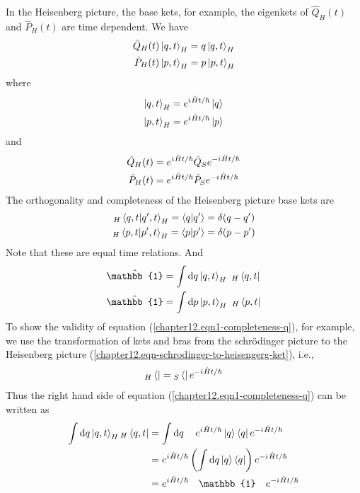 \begin{enumerate}
	In the Heisenberg picture, the base kets, for example, the eigenkets of $\hat{Q}_H(t)$ and $\hat{P}_H(t)$ are time dependent. We have
	\begin{align}
		\hat{Q}_H(t) \ket{q,t}_H &= q \ket{q,t}_H \\
		\hat{P}_H(t) \ket{p,t}_H &= p \ket{p,t}_H
	\end{align}
	where
	\begin{align}
		\ket{q,t}_H &= e^{{i\mkern1mu} \hat{H}t/\hbar}\ket{q}\\
		\ket{p,t}_H &= e^{{i\mkern1mu} \hat{H}t/\hbar}\ket{p}
	\end{align}
	and
	\begin{align}
		\hat{Q}_H(t) &= e^{{i\mkern1mu} \hat{H}t/\hbar} \hat{Q}_S e^{-{i\mkern1mu} \hat{H}t/\hbar}\\
		\hat{P}_H(t) &= e^{{i\mkern1mu} \hat{H}t/\hbar} \hat{P}_S e^{-{i\mkern1mu} \hat{H}t/\hbar}
	\end{align}
	The orthogonality and completeness of the Heisenberg picture base kets are
	\begin{align}
		_H\braket{q,t}{q^\prime,t}_H = \braket{q}{q^\prime} &=  \delta(q-q^\prime) \\
		_H\braket{p,t}{p^\prime,t}_H = \braket{p}{p^\prime} &=  \delta(p-p^\prime) 
	\end{align}
	Note that these are equal time relations. And
	\begin{align}
		\hat{\mathbb{1}} &= \int \dd{q} \ket{q,t}_H \  {_H}\bra{q,t}\label{chapter12.eqn1-completeness-q}\\
		\hat{\mathbb{1}} &= \int \dd{p} \ket{p,t}_H\ {_H}\bra{p,t}\label{chapter12.eqn1-completeness-p}
	\end{align}
	To show the validity of equation (\ref{chapter12.eqn1-completeness-q}), for example, we use the transformation of kets and bras from the schr\"{o}dinger picture to the Heisenberg picture (\ref{chapter12.eqn-schrodinger-to-heisengerg-ket}), i.e., 
	\begin{equation}
		{_H}\bra{} = {_S}\bra{} e^{-{i\mkern1mu} \hat{H}t/\hbar} 
	\end{equation}
	Thus the right hand side of equation (\ref{chapter12.eqn1-completeness-q}) can be written as
	\begin{align}
		\int \dd{q}  \ket{q,t}_H {_H}\bra{q,t} &= \int \dd{q} \quad e^{\iu \hat{H}t/\hbar}\ket{q} \bra{q}e^{-\iu \hat{H}t/\hbar} \\
		&= e^{\iu \hat{H}t/\hbar}\left(\int \dd{q}  \ket{q} \bra{q}\right)e^{-\iu \hat{H}t/\hbar} \\
		&= e^{\iu \hat{H}t/\hbar}\quad\mathbb{1}\quad e^{-\iu \hat{H}t/\hbar} \\

\end{align}
\end{enumerate}

